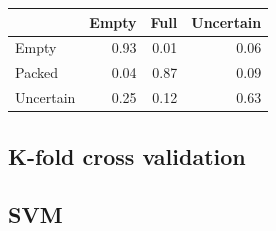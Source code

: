 \documentclass[a4paper, 11pt, table]{article}
\begin{document}
\begin{center}
\begin{tabular}{lrrr}
\hline
 & Empty & Full & Uncertain \\ 
\hline 
Empty & 0.93 & 0.01 & 0.06 \\ 
Packed & 0.04 & 0.87 & 0.09 \\ 
Uncertain & 0.25 & 0.12 & 0.63 \\ 
\end{tabular} 
\end{center}

\subsection{K-fold cross validation}

\subsection{SVM}
\end{document}
